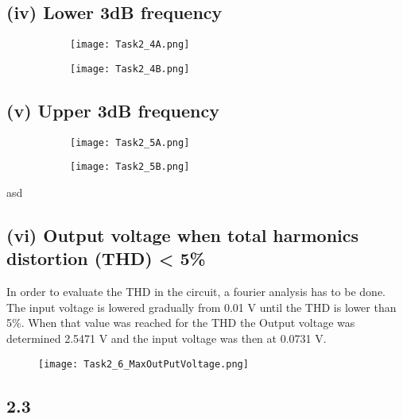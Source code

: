 	\subsection*{(iv) Lower 3dB frequency}

	\begin{figure}[h!]
	    \centering
	    \begin{subfigure}[h]{0.5\textwidth}
	            \texttt{[image: Task2\_4A.png]}
	            \label{fig:}
	    \end{subfigure}
	    \begin{subfigure}[h]{0.2\textwidth}
	            \texttt{[image: Task2\_4B.png]}
	            \label{fig:}
	    \end{subfigure}
	\end{figure}
	
	\subsection*{(v) Upper 3dB frequency}

	\begin{figure}[h!]
	    \centering
	    \begin{subfigure}[h]{0.5\textwidth}
	            \texttt{[image: Task2\_5A.png]}
	            \label{fig:}
	    \end{subfigure}
	    \begin{subfigure}[h]{0.2\textwidth}
	            \texttt{[image: Task2\_5B.png]}
	            \label{fig:}
	    \end{subfigure}
	\end{figure}
	asd
	
  \subsection*{(vi) Output voltage when total harmonics distortion (THD) < 5\%}
  In order to evaluate the THD in the circuit, a fourier analysis has to be done. The input voltage is lowered gradually from 0.01 V until the THD is lower than 5\%. When that value was reached for the THD the Output voltage was determined 2.5471 V and the input voltage was then at 0.0731 V.
  \begin{figure}[h!]
        \centering
        \texttt{[image: Task2\_6\_MaxOutPutVoltage.png]}
    \end{figure}
    
\pagebreak
  
\subsection*{2.3}
  